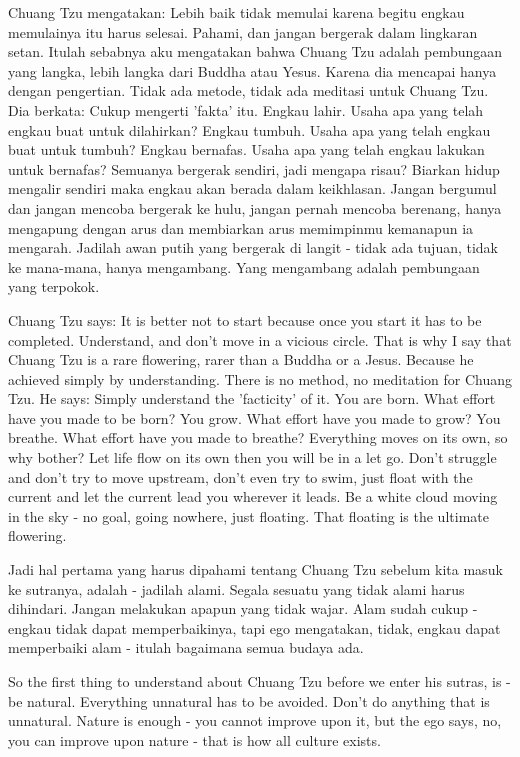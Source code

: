 \bahasa
Chuang Tzu mengatakan: Lebih baik tidak memulai karena begitu engkau memulainya itu harus selesai. Pahami, dan jangan bergerak dalam lingkaran setan. Itulah sebabnya aku mengatakan bahwa Chuang Tzu adalah pembungaan yang langka, lebih langka dari Buddha atau Yesus. Karena dia mencapai hanya dengan pengertian. Tidak ada metode, tidak ada meditasi untuk Chuang Tzu. Dia berkata: Cukup mengerti 'fakta' itu. Engkau lahir. Usaha apa yang telah engkau buat untuk dilahirkan? Engkau tumbuh. Usaha apa yang telah engkau buat untuk tumbuh? Engkau bernafas. Usaha apa yang telah engkau lakukan untuk bernafas? Semuanya bergerak sendiri, jadi mengapa risau? Biarkan hidup mengalir sendiri maka engkau akan berada dalam keikhlasan. Jangan bergumul dan jangan mencoba bergerak ke hulu, jangan pernah mencoba berenang, hanya mengapung dengan arus dan membiarkan arus memimpinmu kemanapun ia mengarah. Jadilah awan putih yang bergerak di langit - tidak ada tujuan, tidak ke mana-mana, hanya mengambang. Yang mengambang adalah pembungaan yang terpokok.

\english
Chuang Tzu says: It is better not to start because once you start it has to be completed. Understand, and don't move in a vicious circle. That is why I say that Chuang Tzu is a rare flowering, rarer than a Buddha or a Jesus. Because he achieved simply by understanding. There is no method, no meditation for Chuang Tzu. He says: Simply understand the 'facticity' of it. You are born. What effort have you made to be born? You grow. What effort have you made to grow? You breathe.
What effort have you made to breathe? Everything moves on its own, so why bother? Let life flow on its own then you will be in a let go. Don't struggle and don't try to move upstream, don't even try to swim, just float with the current and let the current lead you wherever it leads. Be a white cloud moving in the sky - no goal, going nowhere, just floating. That floating is the ultimate flowering.

\bahasa
Jadi hal pertama yang harus dipahami tentang Chuang Tzu sebelum kita masuk ke sutranya, adalah - jadilah alami. Segala sesuatu yang tidak alami harus dihindari. Jangan melakukan apapun yang tidak wajar. Alam sudah cukup - engkau tidak dapat memperbaikinya, tapi ego mengatakan, tidak, engkau dapat memperbaiki alam - itulah bagaimana semua budaya ada.

\english
So the first thing to understand about Chuang Tzu before we enter his sutras, is - be natural. Everything unnatural has to be avoided. Don't do anything that is unnatural. Nature is enough - you cannot improve upon it, but the ego says, no, you can improve upon nature - that is how all culture exists.

